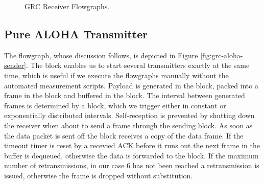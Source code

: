 \begin{figure}
	\begin{center}
		\label{fig:grc-receiver}
		\vskip 40pt
		\label{fig:grc-sniffer}
	\end{center}
	\caption{GRC Receiver Flowgraphs.}
\end{figure}

\subsection{Pure ALOHA Transmitter}
\label{sec:aloha-sender}

The flowgraph, whose discussion follows, is depicted in Figure \ref{fig:grc-aloha-sender}. The  block enables us to start several transmitters exactly at the same time, which is useful if we execute the flowgraphs manually without the automated measurement scripts. Payload is generated in the  block, packed into a frame in the  block and buffered in the  block. The interval between generated frames is determined by a  block, which we trigger either in constant or exponentially distributed intervals. Self-reception is prevented by shutting down the receiver when about to send a frame through the sending block. As soon as the data packet is sent off the  block receives a copy of the data frame. If the timeout timer is reset by a recevied ACK before it runs out the next frame in the buffer is dequeued, otherwise the data is forwarded to the  block. If the maximum number of retransmissions, in our case 6 has not been reached a retransmission is issued, otherwise the frame is dropped without substitution.

